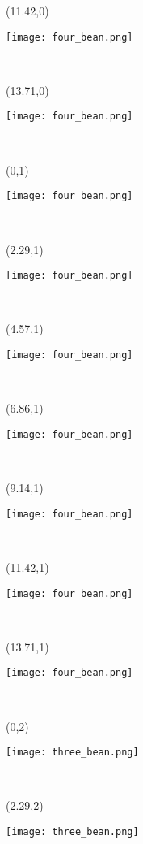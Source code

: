 \documentclass[a4paper]{article}
\newcommand{\myXfourBean}[0]{
\texttt{[image: four\_bean.png]}
}
\newcommand{\myXthreeBean}[0]{
\texttt{[image: three\_bean.png]}
}
\newcommand{\mycard}[5]{%
	\tiny #1 #2
	\hspace{-0.75cm} \large#3\\
}
\begin{document}
\begin{textblock}{2.29}(11.42,0)
\mycard{}{}{
\myXfourBean
}{}{} 
\end{textblock}

\begin{textblock}{2.29}(13.71,0)
\mycard{}{}{
\myXfourBean
}{}{} 
\end{textblock}


\begin{textblock}{2.29}(0,1)
\mycard{}{}{
\myXfourBean
}{}{} 
\end{textblock}

\begin{textblock}{2.29}(2.29,1)
\mycard{}{}{
\myXfourBean
}{}{} 
\end{textblock}

\begin{textblock}{2.29}(4.57,1)
\mycard{}{}{
\myXfourBean
}{}{} 
\end{textblock}

\begin{textblock}{2.29}(6.86,1)
\mycard{}{}{
\myXfourBean
}{}{} 
\end{textblock}

\begin{textblock}{2.29}(9.14,1)
\mycard{}{}{
\myXfourBean
}{}{} 
\end{textblock}

\begin{textblock}{2.29}(11.42,1)
\mycard{}{}{
\myXfourBean
}{}{} 
\end{textblock}

\begin{textblock}{2.29}(13.71,1)
\mycard{}{}{
\myXfourBean
}{}{} 
\end{textblock}


\begin{textblock}{2.29}(0,2)
\mycard{}{}{
\myXthreeBean
}{}{} 
\end{textblock}

\begin{textblock}{2.29}(2.29,2)
\mycard{}{}{
\myXthreeBean
}{}{} 
\end{textblock}
\end{document}
